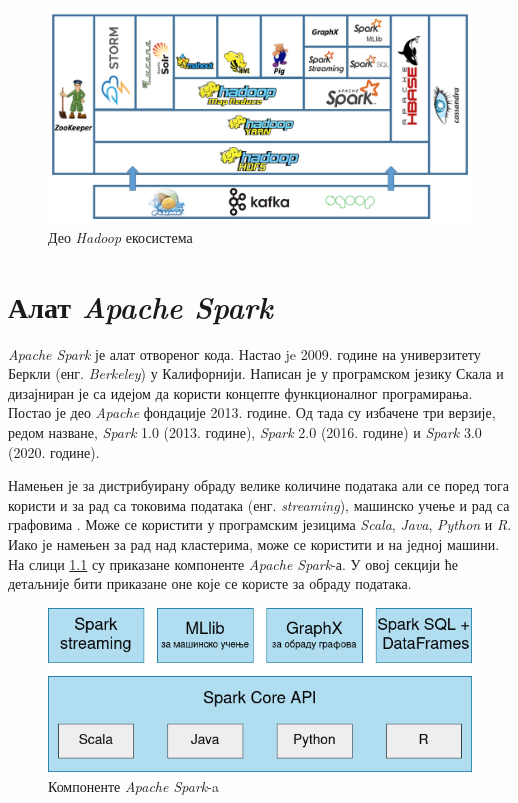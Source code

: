 \documentclass[12pt,oneside]{memoir}
\begin{document}
\begin{figure}[!ht]
  \centering
  \includegraphics[width=1\textwidth]{pictures/hadoop_ecosystem.png}
  \caption{Део \textit{Hadoop} екосистема}
  \label{fig:hadoop_ecosystem}
\end{figure}

\chapter{Алат \textit{Apache Spark}}
\label{chp:spark}


\textit{Apache Spark} је алат отвореног кода. Настао je 2009. године на универзитету Беркли (енг. \textit{Berkeley}) у Калифорнији. Написан је у програмском језику Скала и дизајниран је са идејом да користи концепте функционалног програмирања. Постао је део \textit{Apache} фондације 2013. године. Од тада су избачене три верзије, редом назване, \textit{Spark} 1.0 (2013. године), \textit{Spark} 2.0 (2016. године) и \textit{Spark} 3.0 (2020. године).

Намењен је за дистрибуирану обраду велике количине података али се поред тога користи и за рад са токовима података (енг. \textit{streaming}), машинско учење и рад са графовима \cite{spark_guide}. Може се користити у програмским језицима \textit{Scala}, \textit{Java}, \textit{Python} и \textit{R}. Иако је намењен за рад над кластерима, може се користити и на једној машини. На слици \ref{fig:spark_kompot} су приказане компоненте \textit{Apache Spark}-а. У овој секцији ће детаљније бити приказане оне које се користе за обраду података.

\begin{figure}[!ht]
  \centering
  \includegraphics[width=1\textwidth]{pictures/spark_components.png}
  \caption{Компоненте \textit{Apache Spark}-a}
  \label{fig:spark_kompot}
\end{figure}
\end{document}
